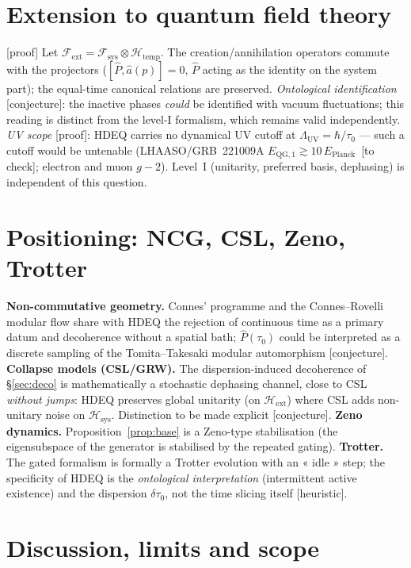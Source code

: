 \documentclass[11pt,a4paper]{article}
\newcommand{\Hext}{\mathcal{H}_{\mathrm{ext}}}
\newcommand{\Hsys}{\mathcal{H}_{\mathrm{sys}}}
\newcommand{\Htemp}{\mathcal{H}_{\mathrm{temp}}}
\newcommand{\statut}[1]{{\footnotesize\textsf{[#1]}}}
\theoremstyle{plain}
\theoremstyle{definition}
\theoremstyle{remark}
\begin{document}
\section{Extension to quantum field theory}
\statut{proof} Let $\mathcal{F}_{\mathrm{ext}}=\mathcal{F}_{\mathrm{sys}}\otimes\Htemp$.
The creation/annihilation operators commute with the projectors
($[\hat P,\hat a(p)]=0$, $\hat P$ acting as the identity on the system part);
the equal-time canonical relations are preserved.
\emph{Ontological identification} \statut{conjecture}: the inactive phases
\emph{could} be identified with vacuum fluctuations; this reading is distinct
from the level-I formalism, which remains valid independently.
\emph{UV scope} \statut{proof}: HDEQ carries no dynamical UV cutoff at
$\Lambda_{\mathrm{UV}}=\hbar/\tau_0$ --- such a cutoff would be untenable
(LHAASO/GRB~221009A $E_{\mathrm{QG},1}\gtrsim10\,E_{\mathrm{Planck}}$~\statut{to check};
electron and muon $g-2$). Level~I (unitarity, preferred basis, dephasing) is
independent of this question.

\section{Positioning: NCG, CSL, Zeno, Trotter}\label{sec:pos}
\textbf{Non-commutative geometry.} Connes' programme and the Connes--Rovelli
modular flow share with HDEQ the rejection of continuous time as a primary datum
and decoherence without a spatial bath; $\hat P(\tau_0)$ could be interpreted as
a discrete sampling of the Tomita--Takesaki modular automorphism \statut{conjecture}.
\textbf{Collapse models (CSL/GRW).} The dispersion-induced decoherence of
\S\ref{sec:deco} is mathematically a stochastic dephasing channel, close to CSL
\emph{without jumps}: HDEQ preserves global unitarity (on $\Hext$) where CSL adds
non-unitary noise on $\Hsys$. Distinction to be made explicit \statut{conjecture}.
\textbf{Zeno dynamics.} Proposition~\ref{prop:base} is a Zeno-type stabilisation
(the eigensubspace of the generator is stabilised by the repeated gating).
\textbf{Trotter.} The gated formalism is formally a Trotter evolution with an
« idle » step; the specificity of HDEQ is the \emph{ontological interpretation}
(intermittent active existence) and the dispersion $\delta\tau_0$, not the time
slicing itself \statut{heuristic}.

\section{Discussion, limits and scope}
\end{document}

